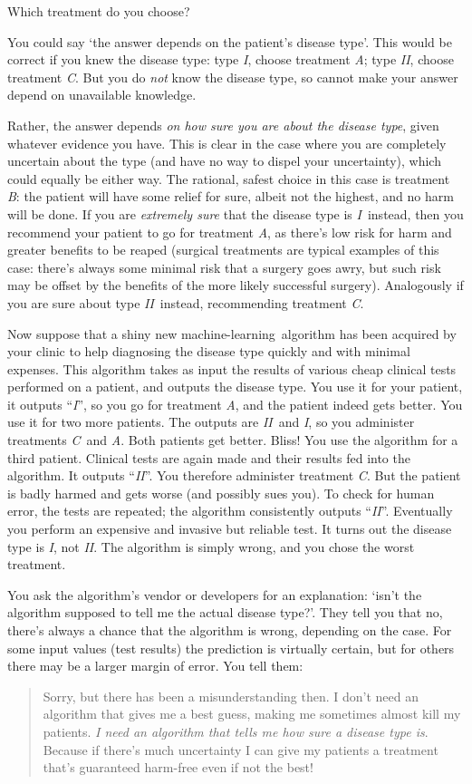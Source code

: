\documentclass[\ifafour a4paper,12pt,\else a5paper,10pt,\fi%
onecolumn,oneside,article,%
british%
]{memoir}
\theoremstyle{remark}
\theoremstyle{innote}
\renewcommand*{\|}[1][]{\nonscript\:#1\vert\nonscript\:\mathopen{}}
\newcommand*{\tI}{\textit{I}}
\newcommand*{\tII}{\textit{II}}
\newcommand*{\tA}{\textit{A}}
\newcommand*{\tB}{\textit{B}}
\newcommand*{\tC}{\textit{C}}
\newcommand*{\ml}{machine-learning}
\begin{document}
Which treatment do you choose?

You could say \enquote*{the answer depends on the patient's disease type}. This would be correct if you knew the disease type: type \tI, choose treatment \tA; type \tII, choose treatment \tC. But you do \emph{not} know the disease type, so cannot make your answer depend on unavailable knowledge.

Rather, the answer depends \emph{on how sure you are about the disease type}, given whatever evidence you have. This is clear in the case where you are completely uncertain about the type (and have no way to dispel your uncertainty), which could equally be either way. The rational, safest choice in this case is treatment \tB: the patient will have some relief for sure, albeit not the highest, and no harm will be done. If you are \emph{extremely sure}  that the disease type is \tI\ instead, then you recommend your patient to go for treatment \tA, as there's low risk for harm  and greater benefits to be reaped (surgical treatments are typical examples of this case: there's always some minimal risk that a surgery goes awry, but such risk may be offset by the benefits of the more likely successful surgery). Analogously if you are sure about type \tII\ instead, recommending treatment \tC.

Now suppose that a shiny new \ml\ algorithm has been acquired by your clinic to help diagnosing the disease type quickly and with minimal expenses. This algorithm takes as input the results of various cheap clinical tests performed on a patient, and outputs the disease type. You use it for your patient, it outputs \enquote{\tI}, so you go for treatment \tA, and the patient indeed gets better. You use it for two more patients. The outputs are \tII\ and \tI, so you administer treatments \tC\ and \tA. Both patients get better. Bliss! You use the algorithm for a third patient. Clinical tests are again made and their results fed into the algorithm. It outputs \enquote{\tII}. You therefore administer treatment \tC. But the patient is badly harmed and gets worse (and possibly sues you). To check for human error, the tests are repeated; the algorithm consistently outputs \enquote{\tII}. Eventually you perform an expensive and invasive but reliable test. It turns out the disease type is \tI, not \tII. The algorithm is simply wrong, and you chose the worst treatment.

You ask the algorithm's vendor or developers for an explanation: \enquote*{isn't the algorithm supposed to tell me the actual disease type?}. They tell you that no, there's always a chance that the algorithm is wrong, depending on the case. For some input values (test results) the prediction is virtually certain, but for others there may be a larger margin of error. You tell them:
\begin{quote}
  Sorry, but there has been a misunderstanding then. I don't need an algorithm that gives me a best guess, making me sometimes almost kill my patients. \emph{I need an algorithm that tells me how sure a disease type is}. Because if there's much uncertainty I can give my patients a treatment that's guaranteed harm-free even if not the best!
\end{quote}
\end{document}
